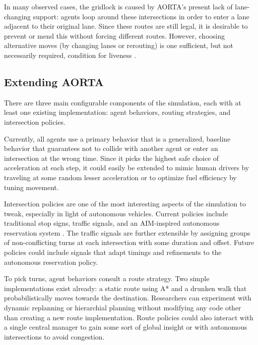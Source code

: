 \documentclass[letterpaper, 10 pt, conference]{ieeeconf}  %
\begin{document}
In many observed cases, the gridlock is caused by AORTA's present lack of
lane-changing support: agents loop around these intersections in order to enter
a lane adjacent to their original lane. Since these routes are still legal, it
is desirable to prevent or mend this without forcing different routes. However,
choosing alternative moves (by changing lanes or rerouting) is one sufficient,
but not necessarily required, condition for liveness \cite{AAAI11-au}.

\subsection{Extending AORTA}
\label{sec:config}

There are three main configurable components of the simulation, each with at
least one existing implementation: agent behaviors, routing strategies, and
intersection policies.

Currently, all agents use a primary behavior that is a generalized, baseline
behavior that guarantees not to collide with another agent or enter an
intersection at the wrong time. Since it picks the highest safe choice of
acceleration at each step, it could easily be extended to mimic human drivers by
traveling at some random lesser acceleration or to optimize fuel efficiency
by tuning movement.

Intersection policies are one of the most interesting aspects of the simulation
to tweak, especially in light of autonomous vehicles. Current policies include
traditional stop signs, traffic signals, and an AIM-inspired autonomous
reservation system \cite{JAIR08-dresner}. The traffic signals are further
extensible by assigning groups of non-conflicting turns at each intersection
with some duration and offset. Future policies could include signals that adapt
timings and refinements to the autonomous reservation policy.

To pick turns, agent behaviors consult a route strategy. Two simple
implementations exist already: a static route using A* \cite{astar} and a
drunken walk that probabilistically moves towards the destination.  Researchers
can experiment with dynamic replanning or hierarchial planning without modifying
any code other than creating a new route implementation. Route policies could
also interact with a single central manager to gain some sort of global insight or
with autonomous intersections to avoid congestion.
\end{document}
